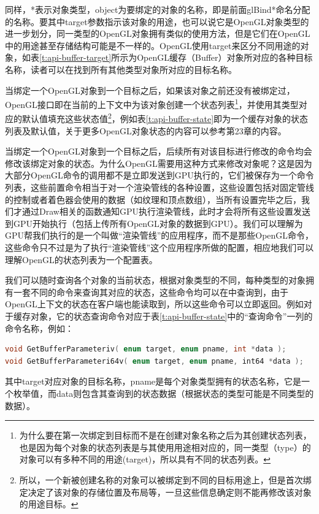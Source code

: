 同样，*表示对象类型，object为要绑定的对象的名称，即是前面glBind*命名分配的名称。要其中target参数指示该对象的用途，也可以说它是OpenGL对象类型的进一步划分，同一类型的OpenGL对象拥有类似的使用方法，但是它们在OpenGL中的用途甚至存储结构可能是不一样的。OpenGL使用target来区分不同用途的对象，如表\ref{t:api-buffer-target}所示为OpenGL缓存（Buffer）对象所对应的各种目标名称，读者可以在\cite{b:OpenGL4.5CoreProfile}找到所有其他类型对象所对应的目标名称。

当绑定一个OpenGL对象到一个目标之后，如果该对象之前还没有被绑定过，OpenGL接口即在当前的上下文中为该对象创建一个状态列表\footnote{为什么要在第一次绑定到目标而不是在创建对象名称之后为其创建状态列表，也是因为每个对象的状态列表是与其使用用途相对应的，同一类型（type）的对象可以有多种不同的用途(target)，所以具有不同的状态列表。}，并使用其类型对应的默认值填充这些状态值\footnote{所以，一个新被创建名称的对象可以被绑定到不同的目标用途上，但是首次绑定决定了该对象的存储位置及布局等，一旦这些信息确定则不能再修改该对象的用途目标。}，例如表\ref{t:api-buffer-state}即为一个缓存对象的状态列表及默认值，关于更多OpenGL对象状态的内容可以参考\cite{b:OpenGL4.5CoreProfile}第23章的内容。

当绑定一个OpenGL对象到一个目标之后，后续所有对该目标进行修改的命令均会修改该绑定对象的状态。为什么OpenGL需要用这种方式来修改对象呢？这是因为大部分OpenGL命令的调用都不是立即发送到GPU执行的，它们被保存为一个命令列表，这些前置命令相当于对一个渲染管线的各种设置，这些设置包括对固定管线的控制或者着色器会使用的数据（如纹理和顶点数组），当所有设置完毕之后，我们才通过Draw相关的函数通知GPU执行渲染管线，此时才会将所有这些设置发送到GPU开始执行（包括上传所有OpenGL对象的数据到GPU）。我们可以理解为GPU帮我们执行的是一个叫做“渲染管线”的应用程序，而不是那些OpenGL命令，这些命令只不过是为了执行“渲染管线”这个应用程序所做的配置，相应地我们可以理解OpenGL的状态列表为一个配置表。

我们可以随时查询各个对象的当前状态，根据对象类型的不同，每种类型的对象拥有一套不同的命令来查询其对应的状态，这些命令均可以在\cite{b:OpenGL4.5CoreProfile}中查询到，由于OpenGL上下文的状态在客户端也能读取到，所以这些命令可以立即返回。例如对于缓存对象，它的状态查询命令对应于表\ref{t:api-buffer-state}中的“查询命令”一列的命令名称，例如：

\begin{lstlisting}[language=C++]
void GetBufferParameteriv( enum target, enum pname, int *data );
void GetBufferParameteri64v( enum target, enum pname, int64 *data );
\end{lstlisting}

其中target对应对象的目标名称，pname是每个对象类型拥有的状态名称，它是一个枚举值，而data则包含其查询到的状态数据（根据状态的类型可能是不同类型的数据）。

